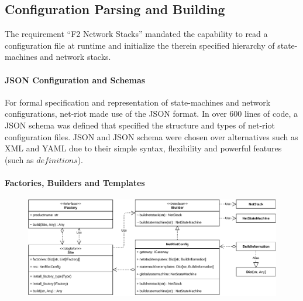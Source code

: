 \subsection{Configuration Parsing and Building}
The requirement \enquote{F2 Network Stacks} mandated the capability to read a configuration file at runtime and initialize the therein specified hierarchy of state-machines and network stacks.

\paragraph{JSON Configuration and Schemas} For formal specification and representation of state-machines and network configurations, net-riot made use of the \ac{JSON} format. In over 600 lines of code, a \ac{JSON} schema was defined that specified the structure and types of net-riot configuration files. \ac{JSON} and \ac{JSON} schema were chosen over alternatives such as XML and YAML due to their simple syntax, flexibility and powerful features (such as $definitions$).

\paragraph{Factories, Builders and Templates}

\begin{figure}[h]
    \centering
    \includegraphics[width=14cm]{img/ch06/net-riot-factory.pdf}
    \label{fig:net-riot-factory}
\end{figure}


